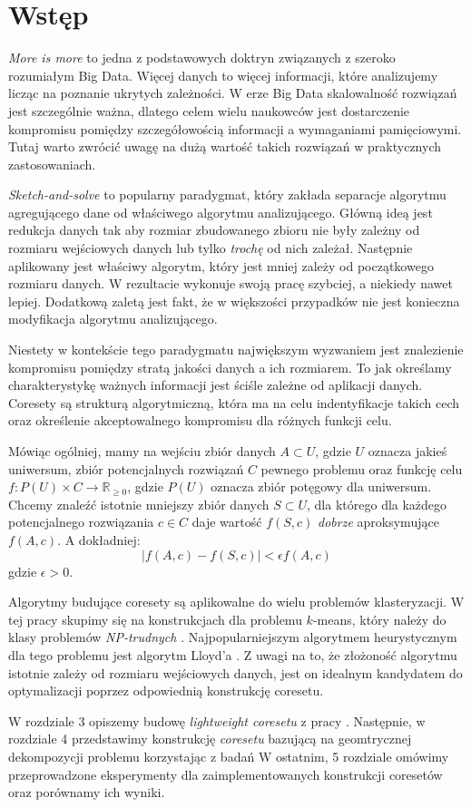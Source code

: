 \chapter{Wstęp}
\textit{More is more} to jedna z podstawowych doktryn związanych z szeroko rozumiałym Big Data.
Więcej danych to więcej informacji, które analizujemy licząc na poznanie ukrytych zależności.
W erze Big Data skalowalność rozwiązań jest szczególnie ważna, dlatego celem wielu naukowców jest dostarczenie kompromisu pomiędzy szczegółowością informacji a wymaganiami pamięciowymi.
Tutaj warto zwrócić uwagę na dużą wartość takich rozwiązań w praktycznych zastosowaniach.

\textit{Sketch-and-solve} to popularny paradygmat, który zakłada separacje algorytmu agregującego dane od właściwego algorytmu analizującego.
Główną ideą jest redukcja danych tak aby rozmiar zbudowanego zbioru nie były zależny od rozmiaru wejściowych danych lub tylko \textit{trochę} od nich zależał.
Następnie aplikowany jest właściwy algorytm, który jest mniej zależy od początkowego rozmiaru danych.
W rezultacie wykonuje swoją pracę szybciej, a niekiedy nawet lepiej.
Dodatkową zaletą jest fakt, że w większości przypadków nie jest konieczna modyfikacja algorytmu analizującego.

Niestety w kontekście tego paradygmatu największym wyzwaniem jest znalezienie kompromisu pomiędzy stratą jakości danych a ich rozmiarem.
To jak określamy charakterystykę ważnych informacji jest ściśle zależne od aplikacji danych.
Coresety są strukturą algorytmiczną, która ma na celu indentyfikacje takich cech oraz określenie akceptowalnego kompromisu dla różnych funkcji celu.

Mówiąc ogólniej, mamy na wejściu zbiór danych $A \subset U$, gdzie $U$ oznacza jakieś uniwersum, zbiór potencjalnych rozwiązań $C$ pewnego problemu oraz funkcję celu $f:P(U) \times C \rightarrow \mathbb{R}_{\geq0}$, gdzie $P(U)$ oznacza zbiór potęgowy dla uniwersum.
Chcemy znaleźć istotnie mniejszy zbiór danych $S \subset U$, dla którego dla każdego potencjalnego rozwiązania $c \in C$ daje wartość $f(S, c)$ \textit{dobrze} aproksymujące $f(A,c)$.
A dokładniej:
\begin{equation}
    |f(A,c) - f(S,c)| < \epsilon f(A,c)
\end{equation}
\noindent
gdzie $\epsilon > 0$.

Algorytmy budujące coresety są aplikowalne do wielu problemów klasteryzacji.
W tej pracy skupimy się na konstrukcjach dla problemu $k$-means, który należy do klasy problemów \textit{NP-trudnych} \cite{article}.
Najpopularniejszym algorytmem heurystycznym dla tego problemu jest algorytm Lloyd'a \cite{1056489}.
Z uwagi na to, że złożoność algorytmu istotnie zależy od rozmiaru wejściowych danych, jest on idealnym kandydatem do optymalizacji poprzez odpowiednią konstrukcję coresetu.

W rozdziale 3 opiszemy budowę \textit{lightweight coresetu} z pracy \cite{bachem2017scalable}.
Następnie, w rozdziale 4 przedstawimy konstrukcję \textit{coresetu} bazującą na geomtrycznej dekompozycji problemu korzystając z badań \cite{DBLP:journals/ki/MunteanuS18}
W ostatnim, 5 rozdziale omówimy przeprowadzone eksperymenty dla zaimplementowanych konstrukcji coresetów oraz porównamy ich wyniki. 